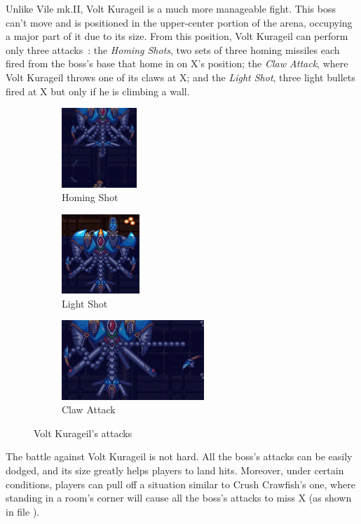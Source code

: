 Unlike Vile mk.II, Volt Kurageil is a much more manageable fight. This boss can't move and is positioned in the upper-center portion of the arena, occupying a major part of it due to its size. From this position, Volt Kurageil can perform only three attacks~\cite{book:Compendium}: the \emph{Homing Shots}, two sets of three homing missiles each fired from the boss's base that home in on X's position; the \emph{Claw Attack}, where Volt Kurageil throws one of its claws at X; and the \emph{Light Shot}, three light bullets fired at X but only if he is climbing a wall.
\begin{figure}[htp]
	\centering
	\begin{subfigure}{.25\linewidth}
		\centering
		\includegraphics[height=3cm]{figures/X3/Doppler_stages/kurageil_missile.jpg}
		\caption{Homing Shot}
	\end{subfigure}
	\begin{subfigure}{.25\linewidth}
		\centering
		\includegraphics[height=3cm]{figures/X3/Doppler_stages/kurageil_plasma.jpg}
		\caption{Light Shot}
	\end{subfigure}
	\begin{subfigure}{\linewidth}
		\centering
		\includegraphics[height=3cm]{figures/X3/Doppler_stages/kurageil_claw.jpg}
		\caption{Claw Attack}
	\end{subfigure}
	\caption{Volt Kurageil's attacks}
\end{figure}
The battle against Volt Kurageil is not hard. All the boss's attacks can be easily dodged, and its size greatly helps players to land hits. Moreover, under certain conditions, players can pull off a situation similar to Crush Crawfish's one, where standing in a room's corner will cause all the boss's attacks to miss X (as shown in file ).

